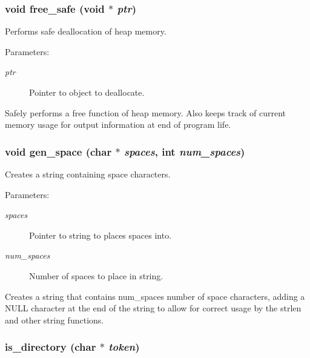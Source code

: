 \subsubsection{\setlength{\rightskip}{0pt plus 5cm}void free\_\-safe (void $\ast$ {\em ptr})}\label{util_8h_a12}


Performs safe deallocation of heap memory.

\begin{Desc}
\item[Parameters: ]\par
\begin{description}
\item[{\em 
ptr}]Pointer to object to deallocate.\end{description}
\end{Desc}
Safely performs a free function of heap memory. Also keeps track of current memory usage for output information at end of program life. 
\subsubsection{\setlength{\rightskip}{0pt plus 5cm}void gen\_\-space (char $\ast$ {\em spaces}, int {\em num\_\-spaces})}\label{util_8h_a13}


Creates a string containing space characters.

\begin{Desc}
\item[Parameters: ]\par
\begin{description}
\item[{\em 
spaces}]Pointer to string to places spaces into. \item[{\em 
num\_\-spaces}]Number of spaces to place in string.\end{description}
\end{Desc}
Creates a string that contains num\_\-spaces number of space characters, adding a NULL character at the end of the string to allow for correct usage by the strlen and other string functions. 
\subsubsection{ is\_\-directory (char $\ast$ {\em token})}\label{util_8h_a3}


